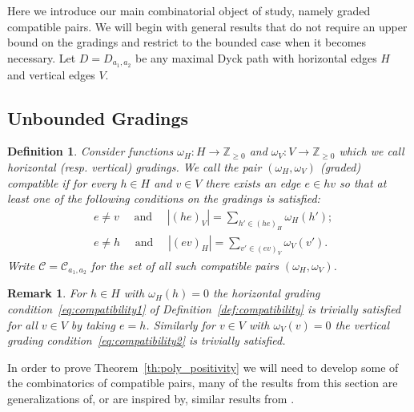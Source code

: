 \documentclass{amsart}
\newtheorem{definition}[theorem]{Definition}
\newtheorem{remark}[theorem]{Remark}
\newcommand{\cC}{\mathcal{C}}
\newcommand{\ZZ}{\mathbb{Z}}
\begin{document}
 Here we introduce our main combinatorial object of study, namely graded compatible pairs.  We will begin with general results that do not require an upper bound on the gradings and restrict to the bounded case when it becomes necessary.  Let $D=D_{a_1,a_2}$ be any maximal Dyck path with horizontal edges $H$ and vertical edges $V$.  

\subsection{Unbounded Gradings}
 \begin{definition}
  Consider functions $\omega_H:H\to\ZZ_{\ge0}$ and $\omega_V:V\to\ZZ_{\ge0}$ which we call \emph{horizontal} (resp. \emph{vertical}) \emph{gradings}.  We call the pair $(\omega_H,\omega_V)$ \emph{(graded) compatible} if for every $h\in H$ and $v\in V$ there exists an edge $e\in hv$ so that at least one of the following conditions on the gradings is satisfied:
  \begin{align}
   \label{eq:compatibility1}\tag{HGC} &\text{$e\ne v$}\quad\text{ and } \quad|(he)_V|=\sum\limits_{h'\in(he)_H}\omega_H(h');\\
   \label{eq:compatibility2}\tag{VGC} &\text{$e\ne h$}\quad\text{ and } \quad|(ev)_H|=\sum\limits_{v'\in(ev)_V}\omega_V(v').
  \end{align}
  Write $\cC=\cC_{a_1,a_2}$ for the set of all such compatible pairs $(\omega_H,\omega_V)$.
 \end{definition}
 \begin{remark}\label{rem:trivial_compatibility}
  For $h\in H$ with $\omega_H(h)=0$ the horizontal grading condition~\eqref{eq:compatibility1} of Definition~\ref{def:compatibility} is trivially satisfied for all $v\in V$ by taking $e=h$.  Similarly for $v\in V$ with $\omega_V(v)=0$ the vertical grading condition~\eqref{eq:compatibility2} is trivially satisfied.
 \end{remark}

 In order to prove Theorem~\ref{th:poly_positivity} we will need to develop some of the combinatorics of compatible pairs, many of the results from this section are generalizations of, or are inspired by, similar results from \cite[Section 3]{llz}.  
\end{document}
